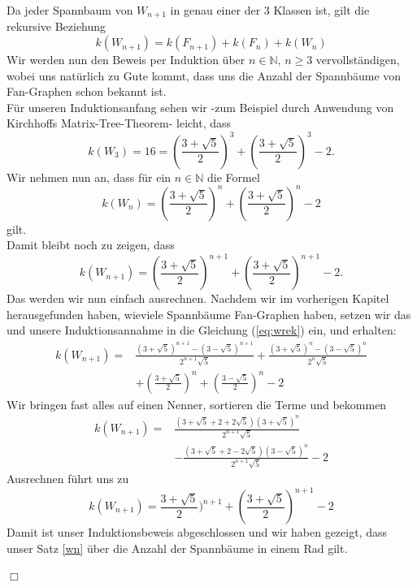 Da jeder Spannbaum von $W_{n+1}$ in genau einer der 3 Klassen ist, gilt die rekursive Beziehung
\begin{equation}
\mathit{k}(W_{n+1}) = \mathit{k}(F_{n+1}) + \mathit{k}(F_n) + \mathit{k}(W_n)
\label{eq:wrek}
\end{equation}
Wir werden nun den Beweis per Induktion über $n \in \mathbb{N}, \, n \geq 3$ vervollständigen, wobei uns natürlich zu Gute kommt, dass uns die Anzahl der Spannbäume von Fan-Graphen schon bekannt ist.\\
Für unseren Induktionsanfang sehen wir -zum Beispiel durch Anwendung von Kirchhoffs Matrix-Tree-Theorem- leicht, dass \begin{equation}
\mathit{k}(W_3) = 16 = (\frac{3+\sqrt{5}}{2})^3+(\frac{3+\sqrt{5}}{2})^3-2.
\end{equation}
Wir nehmen nun an, dass für ein $n \in \mathbb{N}$ die Formel 
\begin{equation}
 \mathit{k}(W_n) = (\frac{3+\sqrt{5}}{2})^n+(\frac{3+\sqrt{5}}{2})^n-2
\end{equation}
gilt.\\
Damit bleibt noch zu zeigen, dass
\begin{equation}
 \mathit{k}(W_{n+1}) = (\frac{3+\sqrt{5}}{2})^{n+1}+(\frac{3+\sqrt{5}}{2})^{n+1}-2.
\end{equation}
Das werden wir nun einfach ausrechnen.
Nachdem wir im vorherigen Kapitel herausgefunden haben, wieviele Spannbäume Fan-Graphen haben, setzen wir das und unsere Induktionsannahme in die Gleichung (\ref{eq:wrek}) ein, und erhalten:\\
\begin{equation}
\begin{aligned}
\mathit{k}(W_{n+1}) ={} & \frac{(3+\sqrt{5})^{n+1}-(3-\sqrt{5})^{n+1}}{2^{n+1}\sqrt{5}} + \frac{(3+\sqrt{5})^{n}-(3-\sqrt{5})^{n}}{2^{n}\sqrt{5}}\\
& + (\frac{3+\sqrt{5}}{2})^n+(\frac{3-\sqrt{5}}{2})^n-2
\end{aligned}
\end{equation}
Wir bringen fast alles auf einen Nenner, sortieren die Terme und bekommen
\begin{equation}
\begin{aligned}
\mathit{k}(W_{n+1}) = {}  & \frac{(3+\sqrt{5}+2+2\sqrt{5})(3+\sqrt{5})^{n}}{2^{n+1}\sqrt{5}} \\%
                        & -\frac{(3+\sqrt{5}+2-2\sqrt{5})(3-\sqrt{5})^{n}}{2^{n+1}\sqrt{5}}-2 
\end{aligned}
\end{equation}
Ausrechnen führt uns zu\\
\begin{equation}
\mathit{k}(W_{n+1}) = \frac{3+\sqrt{5}}{2})^{n+1}+(\frac{3+\sqrt{5}}{2})^{n+1}-2
\end{equation}
Damit ist unser Induktionsbeweis abgeschlossen und wir haben gezeigt, dass unser Satz \ref{wn} über die Anzahl der Spannbäume in einem Rad gilt.
\begin{flushright} $\Box$ \end{flushright} 
